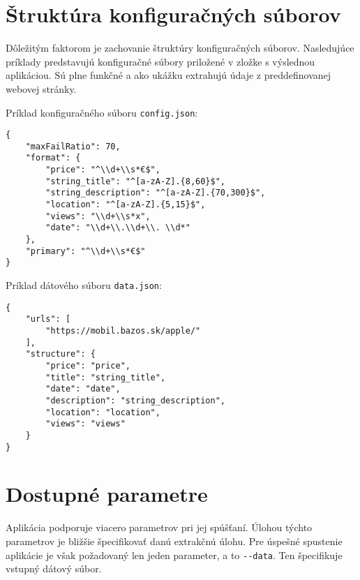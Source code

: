 \section{Štruktúra konfiguračných súborov}

Dôležitým faktorom je zachovanie štruktúry konfiguračných súborov. Nasledujúce príklady predstavujú konfiguračné súbory priložené v zložke s výslednou aplikáciou. Sú plne funkčné a ako ukážku extrahujú údaje z preddefinovanej webovej stránky.

Príklad konfiguračného súboru \texttt{config.json}:
\bigskip
\begin{lstlisting}
{
    "maxFailRatio": 70,
    "format": {
        "price": "^\\d+\\s*€$",
        "string_title": "^[a-zA-Z].{8,60}$",
        "string_description": "^[a-zA-Z].{70,300}$",
        "location": "^[a-zA-Z].{5,15}$",
        "views": "\\d+\\s*x",
        "date": "\\d+\\.\\d+\\. \\d*"
    },
    "primary": "^\\d+\\s*€$"
}
\end{lstlisting}

\newpage

Príklad dátového súboru \texttt{data.json}:
\bigskip

\begin{lstlisting}
{
    "urls": [
        "https://mobil.bazos.sk/apple/"
    ],
    "structure": {
        "price": "price",
        "title": "string_title",
        "date": "date",
        "description": "string_description",
        "location": "location",
        "views": "views"
    }
}
\end{lstlisting}

\bigskip

\section{Dostupné parametre}

Aplikácia podporuje viacero parametrov pri jej spúšťaní. Úlohou týchto parametrov je bližšie špecifikovať danú extrakčnú úlohu. Pre úspešné spustenie aplikácie je však požadovaný len jeden parameter, a to \texttt{-{}-data}. Ten špecifikuje vstupný dátový súbor.

